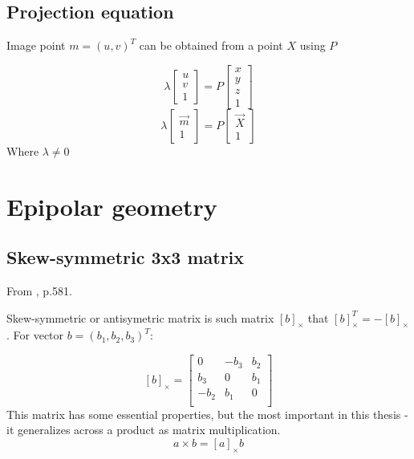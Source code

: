 \subsection{Projection equation}

Image point $m = (u, v)^T$ can be obtained from a point $X$ using $P$ 

$$
\lambda \begin{bmatrix} 
    u \\ v \\ 1 \end{bmatrix} = P \begin{bmatrix} x \\ y \\ z \\ 1
\end{bmatrix}
$$
$$
\lambda \begin{bmatrix} 
    \vec{m} \\ 1 \end{bmatrix} = P \begin{bmatrix} \vec{X} \\ 1
    \end{bmatrix}
$$
Where $\lambda \neq 0$

\section{Epipolar geometry}

\subsection{Skew-symmetric 3x3 matrix}
From \cite{hartley_zisserman_2004}, p.581.


Skew-symmetric or antisymetric matrix is such matrix $[b]_{\times}$ that $[b]_{\times}^T = -[b]_{\times}$. 
For vector $b = (b_1, b_2, b_3)^T$:

$$
[b]_{\times} = \begin{bmatrix}
    0 & -b_3 & b_2 \\ 
    b_3 & 0 & b_1 \\ 
    -b_2 & b_1 & 0 \\ 
\end{bmatrix}
$$
This matrix has some essential properties, but the most important in this thesis - it generalizes across a product as matrix multiplication.
$$
a \times b = [a]_{\times} b
$$

